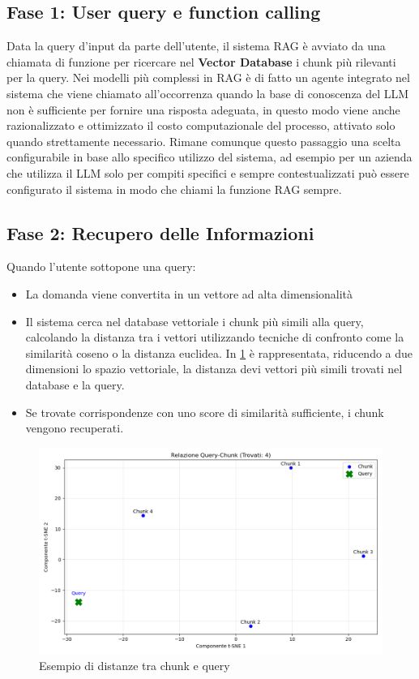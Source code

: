 \documentclass[12pt,a4paper,openright,twoside]{book}
\begin{document}
\subsection{Fase 1: User query e function calling}
Data la query d'input da parte dell'utente, il sistema RAG è avviato da una chiamata di funzione per ricercare nel
\textbf{Vector Database} i chunk più rilevanti per la query.
Nei modelli più complessi in RAG è di fatto un agente integrato nel sistema che viene chiamato all'occorrenza quando la base di conoscenza del LLM non è sufficiente per fornire una risposta adeguata,
in questo modo viene anche razionalizzato e ottimizzato il costo computazionale del processo,
attivato solo quando strettamente necessario.
Rimane comunque questo passaggio una scelta configurabile in base allo specifico utilizzo del sistema,
ad esempio per un azienda che utilizza il LLM solo per compiti specifici e sempre contestualizzati può essere configurato il sistema in modo che chiami
la funzione RAG sempre.
\subsection{Fase 2: Recupero delle Informazioni}
Quando l'utente sottopone una query:
\begin{itemize}
    \item La domanda viene convertita in un vettore ad alta dimensionalità
    \item Il sistema cerca nel database vettoriale i chunk più simili alla query, calcolando la distanza tra i vettori utilizzando tecniche di confronto come la similarità coseno o la distanza euclidea.
    In \cref{fig:Esempio distanze chunk e query} è rappresentata, riducendo a due dimensioni lo spazio vettoriale, la distanza devi vettori più simili trovati nel database e la query.
    \item Se trovate corrispondenze con uno score di similarità sufficiente, i chunk vengono recuperati.
\end{itemize}

\begin{figure}[h]
    \centering
    \includegraphics[width=0.8\linewidth]{figures/plotSearch.png}
    \caption{Esempio di distanze tra chunk e query}  
    \label{fig:Esempio distanze chunk e query}
\end{figure}
\end{document}
